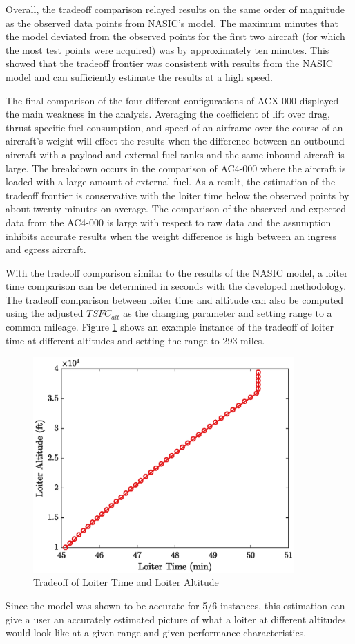 Overall, the tradeoff comparison relayed results on the same order of magnitude as the observed data points from NASIC's model. The maximum minutes that the model deviated from the observed points for the first two aircraft (for which the most test points were acquired) was by approximately ten minutes. This showed that the tradeoff frontier was consistent with results from the NASIC model and can sufficiently estimate the results at a high speed.\par
The final comparison of the four different configurations of ACX-000 displayed the main weakness in the analysis. Averaging the coefficient of lift over drag, thrust-specific fuel consumption, and speed of an airframe over the course of an aircraft's weight will effect the results when the difference between an outbound aircraft with a payload and external fuel tanks and the same inbound aircraft is large. The breakdown occurs in the comparison of AC4-000 where the aircraft is loaded with a large amount of external fuel. As a result, the estimation of the tradeoff frontier is conservative with the loiter time below the observed points by about twenty minutes on average. The comparison of the observed and expected data from the AC4-000 is large with respect to raw data and the assumption inhibits accurate results when the weight difference is high between an ingress and egress aircraft. \par
With the tradeoff comparison similar to the results of the NASIC model, a loiter time comparison can be determined in seconds with the developed methodology. The tradeoff comparison between loiter time and altitude can also be computed using the adjusted $TSFC_{alt}$ as the changing parameter and setting range to a common mileage. Figure \ref{fig:LoiterAltvsTime} shows an example instance of the tradeoff of loiter time at different altitudes and setting the range to 293 miles.
\begin{figure}[H]
    \centering
    \includegraphics[width = 10cm]{Thesis/Analysis/LoiterEnduranceTradeoff.eps}
    \caption{Tradeoff of Loiter Time and Loiter Altitude}
    \label{fig:LoiterAltvsTime}
\end{figure}
Since the model was shown to be accurate for 5/6 instances, this estimation can give a user an accurately estimated picture of what a loiter at different altitudes would look like at a given range and given performance characteristics.  




